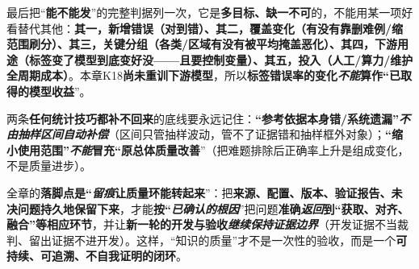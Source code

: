 最后把“\textbf{能不能发}”的完整判据列一次，它是\textbf{多目标、缺一不可}的，不能用某一项好看替代其他：\textbf{其一，新增错误（对到错）、其二，覆盖变化（有没有靠删难例/缩范围刷分）、其三，关键分组（各类/区域有没有被平均掩盖恶化）、其四，下游用途（标签变了模型到底变好没——且要控制变量）、其五，投入（人工/算力/维护全周期成本）}。本章K18\textbf{尚未重训下游模型}，所以\textbf{标签错误率的变化\emph{不能}算作“已取得的模型收益}”。

两条\textbf{任何统计技巧都补不回来}的底线要永远记住：\textbf{“参考依据本身错/系统遗漏”\emph{不由抽样区间自动补偿}}（区间只管抽样波动，管不了证据错和抽样框外对象）；\textbf{“缩小使用范围”\emph{不能}冒充“原总体质量改善}”（把难题排除后正确率上升是组成变化，不是质量进步）。

全章的\textbf{落脚点是“\emph{留痕}让质量环能转起来}”：把\textbf{来源、配置、版本、验证报告、未决问题}\textbf{持久地保留下来}，才能\textbf{按“\emph{已确认的根因}}”把问题\textbf{准确\emph{返回}到“获取、对齐、融合”等相应环节}，并让\textbf{新一轮的开发与验收\emph{继续保持证据边界}}（开发证据不当裁判、留出证据不进开发）。这样，“知识的质量”才不是一次性的验收，而是一个\textbf{可持续、可追溯、不自我证明的闭环}。

